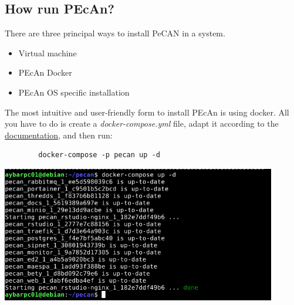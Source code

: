\documentclass{eepecan}
\begin{document}
	\subsection{How run PEcAn?}
	There are three principal ways to install PeCAN in a system.
	\begin{itemize}
		\item Virtual machine
		\item PEcAn Docker
		\item PEcAn OS specific installation
	\end{itemize}

	The most intuitive and user-friendly form to install PEcAn is using docker. All you have to do is create a \emph{docker-compose.yml}
	file, adapt it according to the 	\href{https://pecanproject.github.io/pecan-documentation/master/pecan-manual-setup.html}{documentation}, and then run:
	
	\begin{lstlisting}
		docker-compose -p pecan up -d
	\end{lstlisting}

	
	\begin{novspacecenter}
	\includegraphics[width=120mm]{figures/fig02_docker}
	\label{fig:fig01main}
	\end{novspacecenter}
\end{document}
